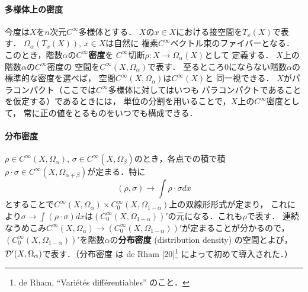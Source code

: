\paragraph{多様体上の密度}
今度は\(X\)を\(n\)次元\(C^{\infty}\)多様体とする．
\(X\)の\(x\in X\)における接空間を\(T_{x}(X)\)で表す．
\(\Omega_{\alpha}(T_{x}(X))\), \(x\in X\)は自然に
複素\(C^{\infty}\)ベクトル束のファイバーとなる．
このとき，階数\(\alpha\)の\(C^{\infty}\)\textbf{密度}を
\(C^{\infty}\)切断\(\rho\colon X\to \Omega_{\alpha}(X)\)として
定義する．
\(X\)上の階数\(\alpha\)の\(C^{\infty}\)密度の
空間を\(C^{\infty}(X,\Omega_{\alpha})\)で表す．
至るところ0にならない階数\(\alpha\)の標準的な密度を選べば，
空間\(C^{\infty}(X,\Omega_{\alpha})\)は\(C^{\infty}(X)\)と
同一視できる．
\(X\)がパラコンパクト（ここでは\(C^{\infty}\)多様体に対してはいつも
パラコンパクトであることを仮定する）であるときには，
単位の分割を用いることで，\(X\)上の\(C^{\infty}\)密度として，
常に正の値をとるものをいつでも構成できる．


\paragraph{分布密度}
\(\rho\in C^{\infty}(X,\Omega_{\alpha})\), \(
    \sigma\in C^{\infty}(X,\Omega_{\beta})
\)のとき，各点での積で積\(
    \rho\cdot\sigma\in C^{\infty}(X,\Omega_{\alpha+\beta})
\)が定まる．特に\[
    (\rho,\sigma)\to\int\rho\cdot\sigma dx
\]とすることで\(
    C^{\infty}(X,\Omega_{\alpha})
    \times 
    C^{\infty}_{0}(X,\Omega_{1-\alpha})
\)上の双線形形式が定まり，
これにより\(\sigma\to\int(\rho\cdot\sigma)dx\)は\(
    (C^{\infty}_{0}(X,\Omega_{1-\alpha}))'
\)の元になる．これも\(\rho\)で表す．
連続なうめこみ\(
    C^{\infty}(X,\Omega_{\alpha})
    \to
    (C^{\infty}_{0}(X,\Omega_{1-\alpha}))'
\)が定まることが分かるので，\(
    (C^{\infty}_{0}(X,\Omega_{1-\alpha}))'
\)を階数\(\alpha\)の\textbf{分布密度} (distribution density) の空間とよび，
\(\mathcal{D}'(X,\Omega_{\alpha})\)で表す．（分布密度
は de Rham [20]\footnote{
    de Rham, ``Vari\'et\'es diff\'erentiables'' のこと．
} によって初めて導入された．）






